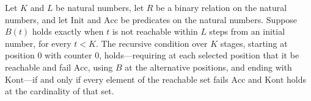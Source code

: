 \begin{lemma}
\label{Complexity.LogProg.ISCount.gs_outer}
\leanok
{}
Let $K$ and $L$ be natural numbers, let $R$ be a binary relation on the natural numbers,
and let $\text{Init}$ and $\text{Acc}$ be predicates on the natural numbers. Suppose
$B(t)$ holds exactly when $t$ is not reachable within $L$ steps from an initial number,
for every $t<K$. The recursive condition over $K$ stages, starting at position $0$ with
counter $0$, holds—requiring at each selected position that it be reachable and fail
$\text{Acc}$, using $B$ at the alternative positions, and ending with $\text{Kont}$—if and
only if every element of the reachable set fails $\text{Acc}$ and $\text{Kont}$ holds at
the cardinality of that set.
\end{lemma}
